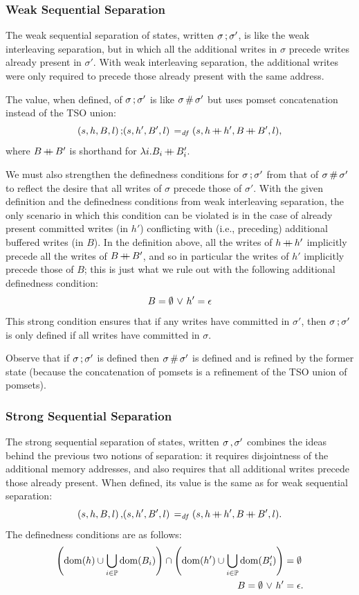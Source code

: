 \documentclass[11pt]{report}
\begin{document}
\subsubsection{Weak Sequential Separation}

The weak sequential separation of states, written $\sigma \operatorname{;} \sigma'$, is like the weak interleaving separation, but in which all the additional writes in $\sigma$ precede writes already present in $\sigma'$. With weak interleaving separation, the additional writes were only required to precede those already present with the same address. 

The value, when defined, of $\sigma \operatorname{;} \sigma'$ is like $\sigma \operatorname{\#} \sigma'$ but uses pomset concatenation instead of the TSO union: \[ (s,h,B,l) \operatorname{;} (s,h',B',l) \operatorname{\;=_{\mathit{df}}\;} (s,h \operatorname{+\!\!\!+} h',B \operatorname{+\!\!\!+} B',l),\] where $B \operatorname{+\!\!\!+} B'$ is shorthand for $\lambda i . B_i \operatorname{+\!\!\!+} B'_i$. 

We must also strengthen the definedness conditions for $\sigma \operatorname{;} \sigma'$ from that of $\sigma \operatorname{\#} \sigma'$ to reflect the desire that all writes of $\sigma$ precede those of $\sigma'$. With the given definition and the definedness conditions from weak interleaving separation, the only scenario in which this condition can be violated is in the case of already present committed writes (in $h'$) conflicting with (i.e., preceding) additional buffered writes (in $B$). In the definition above, all the writes of $h \operatorname{+\!\!\!+} h'$ implicitly precede all the writes of $B \operatorname{+\!\!\!+} B'$, and so in particular the writes of $h'$ implicitly precede those of $B$; this is just what we rule out with the following additional definedness condition: \[ B = \operatorname{\emptyset} \operatorname{\,\vee\,} h' = \epsilon \] This strong condition ensures that if any writes have committed in $\sigma'$, then $\sigma \operatorname{;} \sigma'$ is only defined if all writes have committed in $\sigma$. 

Observe that if $\sigma \operatorname{;} \sigma'$ is defined then $\sigma \operatorname{\#} \sigma'$ is defined and is refined by the former state (because the concatenation of pomsets is a refinement of the TSO union of pomsets). 

\subsubsection{Strong Sequential Separation}

The strong sequential separation of states, written $\sigma \operatorname{,} \sigma'$ combines the ideas behind the previous two notions of separation: it requires disjointness of the additional memory addresses, and also requires that all additional writes precede those already present. When defined, its value is the same as for weak sequential separation: \[ (s,h,B,l) \operatorname{,} (s,h',B',l) \operatorname{\;=_{\mathit{df}}\;} (s,h \operatorname{+\!\!\!+} h', B \operatorname{+\!\!\!+} B',l).\] The definedness conditions are as follows: \begin{align*}
	\left(\operatorname{\mathrm{dom}}(h) \cup \bigcup_{i \in \mathbb{P}} \operatorname{\mathrm{dom}}(B_i) \right) \cap \left( \operatorname{\mathrm{dom}}(h') \cup \bigcup_{i \in \mathbb{P}} \operatorname{\mathrm{dom}}(B'_i)\right) & = \operatorname{\emptyset} \\ 
	B = \operatorname{\emptyset} \operatorname{\,\vee\,} h' & = \epsilon.
\end{align*}
\end{document}
